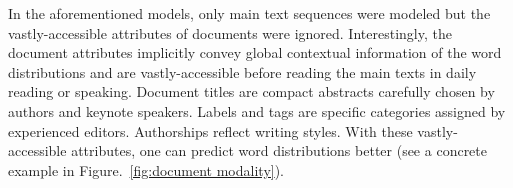 \documentclass[a4paper]{article}
\begin{document}




In the aforementioned models, only main text sequences were modeled but the vastly-accessible attributes of documents were ignored.
Interestingly, the document attributes implicitly convey global contextual information of the word distributions and are vastly-accessible before reading the main texts in daily reading or speaking. Document titles are compact abstracts carefully chosen by authors and keynote speakers. Labels and tags are specific categories assigned by experienced editors. Authorships reflect writing styles. With these vastly-accessible attributes, one can predict word distributions better (see a concrete example in Figure.~\ref{fig:document modality}).
\end{document}
